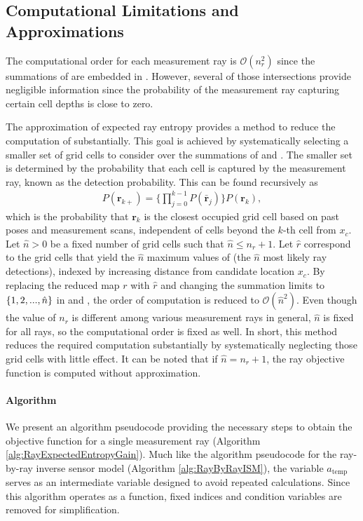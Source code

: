 \subsection{Computational Limitations and Approximations}

The computational order for each measurement ray is $\mathcal O(n_{r}^2)$ since the summations of  are embedded in . However, several of those intersections provide negligible information since the probability of the measurement ray capturing certain cell depths is close to zero.

The approximation of expected ray entropy provides a method to reduce the computation of  substantially. This goal is achieved by systematically selecting a smaller set of grid cells to consider over the summations of  and .
The smaller set is determined by the probability that each cell is captured by the measurement ray, known as the detection probability. This can be found recursively as
\begin{align}
\label{eqn:ProbOfFirstCell}
P(\mathbf{r}_{k+})%
=\bigg\{\prod_{j=0}^{k-1}P(\bar{\mathbf{r}}_{j})\bigg\}P(\mathbf{r}_{k}),
\end{align}
which is the probability that $\mathbf{r}_{k}$ is the closest occupied grid cell based on past poses and measurement scans, independent of cells beyond the $k$-th cell from $x_c$.
Let $\hat n>0$ be a fixed number of grid cells such that $\hat n\leq n_{r}+1$.
Let $\hat{r}$ correspond to the grid cells that yield the $\hat{n}$ maximum values of  (the $\hat n$ most likely ray detections), indexed by increasing distance from candidate location $x_c$.
By replacing the reduced map $r$ with $\hat{r}$ and changing the summation limits to $\left\{ 1,2,...,\hat n \right\}$ in  and , the order of computation is reduced to $\mathcal O({\hat{n}}^2)$.
Even though the value of $n_{r}$ is different among various measurement rays in general, $\hat n$ is fixed for all rays, so the computational order is fixed as well.
In short, this method reduces the required computation substantially by systematically neglecting those grid cells with little effect. It can be noted that if $\hat n=n_{r}+1$, the ray objective function is computed without approximation.


\paragraph{Algorithm} We present an algorithm pseudocode providing the necessary steps to obtain the objective function for a single measurement ray (Algorithm \ref{alg:RayExpectedEntropyGain}). Much like the algorithm pseudocode for the ray-by-ray inverse sensor model (Algorithm \ref{alg:RayByRayISM}), the variable $a_\text{temp}$ serves as an intermediate variable designed to avoid repeated calculations.
Since this algorithm operates as a function, fixed indices and condition variables are removed for simplification. 

